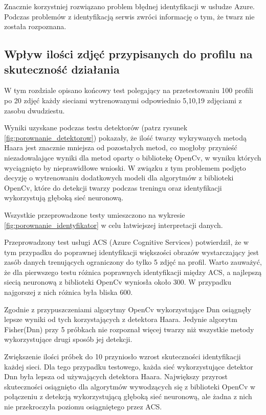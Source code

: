Znacznie korzystniej rozwiązano problem błędnej identyfikacji w usłudze Azure. Podczas problemów z identyfikacją serwis zwróci informację o tym, że twarz nie została rozpoznana.

\subsection{Wpływ ilości zdjęć przypisanych do profilu na skuteczność działania}
W tym rozdziale opisano końcowy test polegający na przetestowaniu 100 profili po 20 zdjęć każdy sieciami wytrenowanymi odpowiednio 5,10,19 zdjęciami z zasobu dwudziestu.

Wyniki uzyskane podczas testu detektorów (patrz rysunek \ref{fig:porownanie_detektorow}) pokazały, że ilość twarzy wykrywanych metodą Haara jest znacznie mniejsza od pozostałych metod, co mogłoby przynieść niezadowalające wyniki dla metod oparty o bibliotekę OpenCv, w wyniku których wyciągnięto by nieprawidłowe wnioski. W związku z tym problemem podjęto decyzję o wytrenowaniu dodatkowych modeli dla algorytmów z biblioteki OpenCv, które do detekcji twarzy podczas treningu oraz identyfikacji wykorzystują głęboką sieć neuronową.

Wszystkie przeprowadzone testy umieszczono na wykresie \ref{fig:porownanie_identyfikator} w celu łatwiejszej interpretacji danych.

Przeprowadzony test usługi ACS (Azure Cognitive Services) potwierdził, że w tym przypadku do poprawnej identyfikacji większości obrazów wystarczający jest zasób danych trenujących ograniczony do tylko 5 zdjęć na profil. Warto zauważyć, że dla pierwszego testu różnica poprawnych identyfikacji między ACS, a najlepszą siecią neuronową z biblioteki OpenCv wyniosła około 300. W przypadku najgorszej z nich różnica była bliska 600.

Zgodnie z przypuszczeniami algorytmy OpenCv wykorzystujące Dnn osiągnęły lepsze wyniki od tych korzystających z detektora Haara. Jedynie algorytm Fisher(Dnn) przy 5 próbkach nie rozpoznał więcej twarzy niż wszystkie metody wykorzystujące drugi sposób jej detekcji.

Zwiększenie ilości próbek do 10 przyniosło wzrost skuteczności identyfikacji każdej sieci. Dla tego przypadku testowego, każda sieć wykorzystujące detektor Dnn była lepsza od używających detektora Haara. Największy przyrost skuteczności osiągnięto dla algorytmów wywodzących się z biblioteki OpenCv w połączeniu z detekcją wykorzystującą głęboką sieć neuronową, ale żadna z nich nie przekroczyła poziomu osiągniętego przez ACS.

